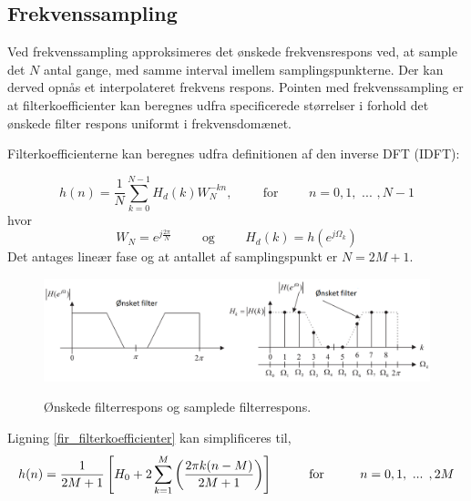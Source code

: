 \subsection{Frekvenssampling}
Ved frekvenssampling approksimeres det ønskede frekvensrespons ved, at sample det $N$ antal gange, med samme interval imellem samplingspunkterne. Der kan derved opnås et interpolateret frekvens respons.
Pointen med frekvenssampling er at filterkoefficienter kan beregnes udfra specificerede størrelser i forhold det ønskede filter respons uniformt i frekvensdomænet.

Filterkoefficienterne kan beregnes udfra definitionen af den inverse DFT (IDFT):

\begin {equation}
h(n)=\frac{1}{N}\sum_{k=0}^{N-1}H_{d}(k)W_{N}^{-kn} ,\hspace{1cm}\text{for}\hspace{1cm} n = 0, 1,\text{ ... }, N-1 \label{fir_filterkoefficienter}
\end {equation}
hvor
\begin {equation}
W_{N}=e^{j\frac{2\pi}{N}} \hspace{1cm}\text{og} \hspace{1cm} H_{d}(k)=h(e^{j\Omega_{k}}) \nonumber
\end {equation}
Det antages lineær fase og at antallet af samplingspunkt er $N=2M+1$.



\begin{figure}[h]
\centering
\includegraphics[width=.90\textwidth]{billeder/fir_frekvenssampling.png}\label{fig:fir_frekvenssampling}
\caption{Ønskede filterrespons og samplede filterrespons.}
\end{figure}
\FloatBlock
Ligning \ref{fir_filterkoefficienter} kan simplificeres til,
\begin {equation}
h(n)=\frac{1}{2M+1}\left[ H_{0}+2\sum_{k=1}^{M} \left( \frac{2\pi k(n-M)}{2M+1} \right) \right] \hspace{1cm} \text{for} \hspace{1 cm} n=0,1,\text{ ... },2M
\end {equation}

